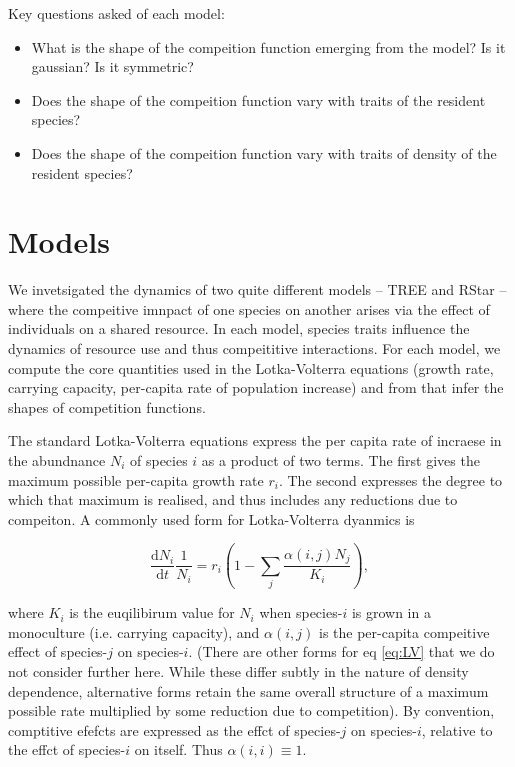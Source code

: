 \documentclass[a4paper,11pt]{article}
\newcommand{\ud}{\ensuremath{\mathrm{d}}}
\begin{document}
Key questions asked of each model:

\begin{itemize}
\item What is the shape of the compeition function emerging from the model? Is
it gaussian? Is it symmetric?
\item Does the shape of the compeition function vary with traits of the
resident species?
\item Does the shape of the compeition function vary with traits of density
of the resident species?
\end{itemize}


\section{Models}


We invetsigated the dynamics of two quite different models -- TREE and RStar
-- where the compeitive imnpact of one species on another arises via the
effect of individuals on a shared resource. In each model, species traits
influence the dynamics of resource use and thus compeititive interactions. For
each model, we compute the core quantities used in the Lotka-Volterra
equations (growth rate, carrying capacity,  per-capita rate of population
increase) and from that infer the shapes of competition functions.

The standard Lotka-Volterra equations express the per capita rate of incraese
in the abundnance $N_i$ of species $i$ as a product of two terms. The first
gives the maximum possible per-capita growth rate $r_i$. The second expresses
the degree to which that maximum is realised, and thus includes any reductions
due to compeiton. A commonly used form for Lotka-Volterra dyanmics is

\begin{equation}
\label{eq:LV}
\frac{\ud N_i}{\ud t} \frac{1}{N_i} =  r_i \left(1 - \sum_j
                                      \frac{\alpha(i,j) N_j}{K_i}\right),
\end{equation}

where $K_i$ is the euqilibirum value for $N_i$ when species-$i$ is grown in a
monoculture  (i.e. carrying capacity), and $\alpha(i,j)$ is the per-capita
compeitive effect of species-$j$ on species-$i$. (There are other forms for eq
\ref{eq:LV} that we do not consider further here. While these differ subtly in
the nature of density dependence, alternative forms retain the same overall
structure of a maximum possible rate multiplied by some reduction due to
competition). By convention, comptitive efefcts are expressed as the effct of
species-$j$ on species-$i$, relative to the effct of species-$i$ on itself.
Thus $\alpha(i, i) \equiv 1$.
\end{document}
